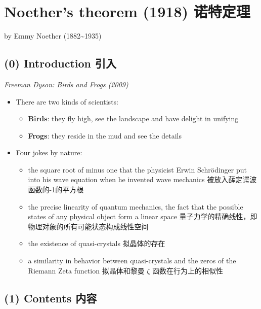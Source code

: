 \section{Noether's theorem (1918)
诺特定理}\label{noethers-theorem-1918-ux8bfaux7279ux5b9aux7406}

by Emmy Noether (1882\textasciitilde1935)

\subsection*{(0) Introduction 引入}\label{introduction-ux5f15ux5165}

\emph{Freeman Dyson: Birds and Frogs (2009)}

\begin{itemize}
\tightlist{}
\item
  There are two kinds of scientists:

  \begin{itemize}
\tightlist{}
  \item
    \textbf{Birds}: they fly high, see the landscape and have delight in
    unifying
  \item
    \textbf{Frogs}: they reside in the mud and see the details
  \end{itemize}
\item
  Four jokes by nature:

  \begin{itemize}
\tightlist{}
  \item
    the square root of minus one that the physicist Erwin Schrödinger
    put into his wave equation when he invented wave mechanics
    被放入薛定谔波函数的-1的平方根
  \item
    the precise linearity of quantum mechanics, the fact that the
    possible states of any physical object form a linear space
    量子力学的精确线性，即物理对象的所有可能状态构成线性空间
  \item
    the existence of quasi-crystals 拟晶体的存在
  \item
    a similarity in behavior between quasi-crystals and the zeros of the
    Riemann Zeta function 拟晶体和黎曼 \(\zeta\) 函数在行为上的相似性
  \end{itemize}
\end{itemize}

\subsection*{(1) Contents 内容}\label{contents-ux5185ux5bb9-1}

